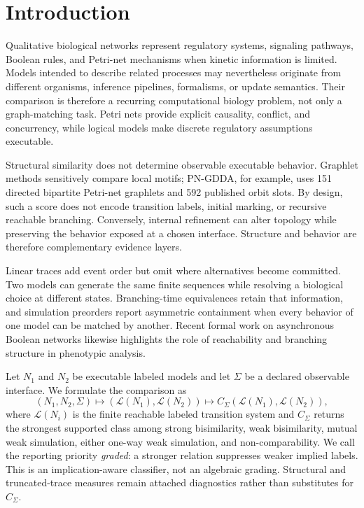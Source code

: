 \documentclass{ws-jbcb}
\numberwithin{equation}{section}
\newcommand{\LTS}{\mathcal{L}}
\begin{document}
\section{Introduction}\label{sec:introduction}

Qualitative biological networks represent regulatory systems, signaling
pathways, Boolean rules, and Petri-net mechanisms when kinetic information is
limited. Models intended to describe related processes may nevertheless originate
from different organisms, inference pipelines, formalisms, or update semantics.
Their comparison is therefore a recurring computational biology problem, not
only a graph-matching task. Petri nets provide explicit causality, conflict, and
concurrency, while logical models make discrete regulatory assumptions
executable.\cite{Murata1989,ChaouiyaPetriBio2007,Li2006,Fisher2007}

Structural similarity does not determine observable executable behavior.
Graphlet methods sensitively compare local motifs; PN-GDDA, for example, uses
151 directed bipartite Petri-net graphlets and 592 published orbit
slots.\cite{Szawulak2022} By design, such a score does not encode transition
labels, initial marking, or recursive reachable branching. Conversely, internal
refinement can alter topology while preserving the behavior exposed at a chosen
interface. Structure and behavior are therefore complementary evidence layers.

Linear traces add event order but omit where alternatives become committed.
Two models can generate the same finite sequences while resolving a biological
choice at different states. Branching-time equivalences retain that information,
and simulation preorders report asymmetric containment when every behavior of one
model can be matched by another. Recent formal work on asynchronous Boolean
networks likewise highlights the role of reachability and branching structure in
phenotypic analysis.\cite{Yizengaw2026}

Let $N_1$ and $N_2$ be executable labeled models and let $\Sigma$ be a declared
observable interface. We formulate the comparison as
\begin{equation}\label{eq:comparison-map}
 (N_1,N_2,\Sigma)
 \longmapsto (\LTS(N_1),\LTS(N_2))
 \longmapsto C_{\Sigma}(\LTS(N_1),\LTS(N_2)),
\end{equation}
where $\LTS(N_i)$ is the finite reachable labeled transition system and
$C_{\Sigma}$ returns the strongest supported class among strong bisimilarity,
weak bisimilarity, mutual weak simulation, either one-way weak simulation, and
non-comparability. We call the reporting priority \emph{graded}: a stronger
relation suppresses weaker implied labels. This is an implication-aware
classifier, not an algebraic grading. Structural and truncated-trace measures
remain attached diagnostics rather than substitutes for $C_{\Sigma}$.
\end{document}
